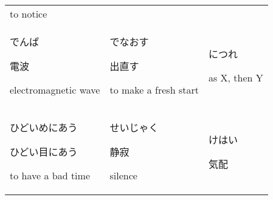 \documentclass[12pt, a4j, landscape, dvipdfmx]{utarticle}
\begin{document}
\begin{minipage}[t][0pt]{\linewidth }
\begin{tabular}{||p{5.5cm}||p{5.5cm}||p{5.5cm}||}
            {\small to notice}\tabularnewline
            \hhline{|:=::=::=:|} \rule{0pt}{3ex}
            \hspace*{-.4cm} {\LARGE でんぱ}\newline
            \rule{0pt}{3ex} \hspace*{.4cm} {\small
            電波}\newline \rule{0pt}{3ex} \hspace*{.425cm}
            {\small electromagnetic wave}&\rule{0pt}{3ex}
            \hspace*{-.4cm} {\LARGE でなおす}\newline
            \rule{0pt}{3ex} \hspace*{.4cm} {\small
            出直す}\newline \rule{0pt}{3ex} \hspace*{.425cm}
            {\small to make a fresh start}&\rule{0pt}{3ex}
            \hspace*{-.4cm} {\LARGE につれ}\newline
            \rule{0pt}{3ex} \hspace*{.4cm} {\small }\newline
            \rule{0pt}{3ex} \hspace*{.425cm} {\small
            as X, then Y}\tabularnewline
            \hhline{|:=::=::=:|} \rule{0pt}{3ex}
            \hspace*{-.4cm} {\LARGE ひどいめにあう}\newline
            \rule{0pt}{3ex} \hspace*{.4cm} {\small
            ひどい目にあう}\newline \rule{0pt}{3ex}
            \hspace*{.425cm} {\small
            to have a bad time}&\rule{0pt}{3ex}
            \hspace*{-.4cm} {\LARGE せいじゃく}\newline
            \rule{0pt}{3ex} \hspace*{.4cm} {\small
            静寂}\newline \rule{0pt}{3ex} \hspace*{.425cm}
            {\small silence}&\rule{0pt}{3ex} \hspace*{-.4cm}
            {\LARGE けはい}\newline \rule{0pt}{3ex}
            \hspace*{.4cm} {\small 気配}\newline
            \rule{0pt}{3ex} \hspace*{.425cm} {\small
}
\end{tabular}
\end{minipage}
\end{document}
